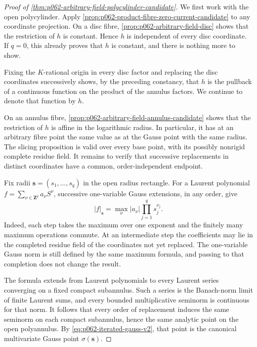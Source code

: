 \begin{proof}[Proof of \cref{thm:p062-arbitrary-field-polycylinder-candidate}]
We first work with the open polycylinder. Apply
\cref{prop:p062-product-fibre-zero-current-candidate} to any coordinate
projection. On a disc fibre, \cref{prop:p062-arbitrary-field-disc} shows
that the restriction of \(h\) is constant. Hence \(h\) is independent of
every disc coordinate.
If \(q=0\), this already proves that \(h\) is constant, and there is
nothing more to show.

Fixing the \(K\)-rational origin in every disc factor and replacing the
disc coordinates successively shows, by the preceding constancy, that
\(h\) is the pullback of a continuous function on the product of the
annulus factors. We continue to denote that function by \(h\).

On an annulus fibre, \cref{prop:p062-arbitrary-field-annulus-candidate}
shows that the restriction of \(h\) is affine in the logarithmic radius.
In particular, it has at an arbitrary fibre point the same value as at the
Gauss point with the same radius. The slicing proposition is valid over
every base point, with its possibly nonrigid complete residue field. It
remains to verify that successive replacements in distinct coordinates
have a common, order-independent endpoint.

Fix radii \(\mathbf s=(s_1,\ldots,s_q)\) in the open radius rectangle. For
a Laurent polynomial
\(
 f=\sum_{\nu\in\mathbf Z^q}a_\nu S^\nu
\), successive one-variable Gauss extensions, in any order, give
\begin{equation}\label{eq:p062-iterated-gauss-v2}
                  |f|_{\mathbf s}
                   =\max_{\nu}|a_\nu|
                         \prod_{j=1}^q s_j^{\nu_j}.
\end{equation}
Indeed, each step takes the maximum over one exponent and the finitely
many maximum operations commute. At an intermediate step the coefficients
may lie in the completed residue field of the coordinates not yet
replaced. The one-variable Gauss norm is still defined by the same maximum
formula, and passing to that completion does not change the result.

The formula extends from Laurent polynomials to every Laurent series
converging on a fixed compact subannulus. Such a series is the Banach-norm
limit of finite Laurent sums, and every bounded multiplicative seminorm is
continuous for that norm. It follows that every order of replacement
induces the same seminorm on each compact subannulus, hence the same
analytic point on the open polyannulus. By
\eqref{eq:p062-iterated-gauss-v2}, that point is the canonical
multivariate Gauss point \(\sigma(\mathbf s)\).


\end{proof}
